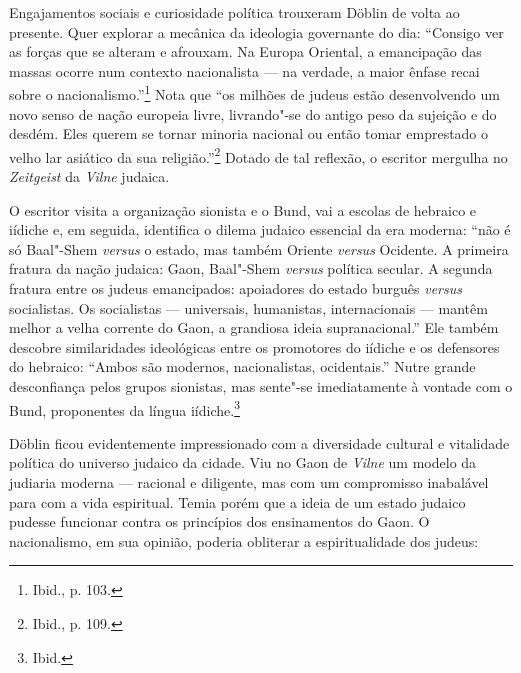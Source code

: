 Engajamentos sociais e curiosidade política trouxeram Döblin de volta ao
presente. Quer explorar a mecânica da ideologia governante do dia:
``Consigo ver as forças que se alteram e afrouxam. Na Europa Oriental, a
emancipação das massas ocorre num contexto nacionalista --- na verdade, a
maior ênfase recai sobre o nacionalismo.''\footnote{Ibid., p. 103.} Nota
que ``os milhões de judeus estão desenvolvendo um novo senso de nação
europeia livre, livrando"-se do antigo peso da sujeição e do desdém. Eles
querem se tornar minoria nacional ou então tomar emprestado o velho lar
asiático da sua religião.''\footnote{Ibid., p. 109.} Dotado de tal
reflexão, o escritor mergulha no \textit{Zeitgeist} da \textit{Vilne} judaica.


O escritor visita a organização sionista e o Bund, vai a escolas de
hebraico e iídiche e, em seguida, identifica o dilema judaico essencial
da era moderna: ``não é só Baal"-Shem \textit{versus} o estado, mas também
Oriente \textit{versus} Ocidente. A primeira fratura da nação judaica:
Gaon, Baal"-Shem \textit{versus} política secular. A segunda fratura entre
os judeus emancipados: apoiadores do estado burguês \textit{versus}
socialistas. Os socialistas --- universais, humanistas, internacionais ---
mantêm melhor a velha corrente do Gaon, a grandiosa ideia
supranacional.'' Ele também descobre similaridades ideológicas entre os
promotores do iídiche e os defensores do hebraico: ``Ambos são modernos,
nacionalistas, ocidentais.'' Nutre grande desconfiança pelos grupos
sionistas, mas sente"-se imediatamente à vontade com o Bund, proponentes
da língua iídiche.\footnote{Ibid.}

\asterisc

Döblin ficou evidentemente impressionado com a diversidade cultural e
vitalidade política do universo judaico da cidade. Viu no Gaon de \textit{Vilne}
um modelo da judiaria moderna --- racional e diligente, mas com um
compromisso inabalável para com a vida espiritual. Temia porém que a
ideia de um estado judaico pudesse funcionar contra os princípios dos
ensinamentos do Gaon. O nacionalismo, em sua opinião, poderia obliterar
a espiritualidade dos judeus:

